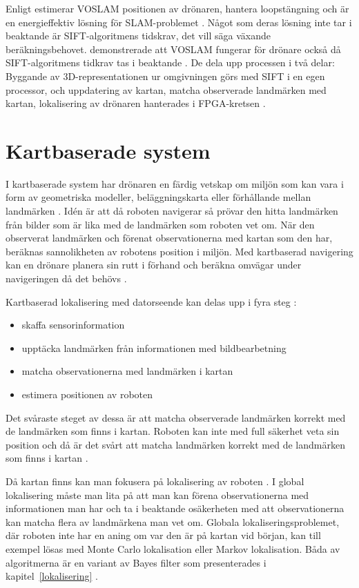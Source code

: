Enligt \cite{voslam} estimerar VOSLAM positionen av drönaren, hantera loopstängning och är en energieffektiv lösning för SLAM-problemet \citep{voslam}. Något som deras lösning inte tar i beaktande är SIFT-algoritmens tidskrav, det vill säga växande beräkningsbehovet. \cite{voslamlatif} demonstrerade att VOSLAM fungerar för drönare också då SIFT-algoritmens tidkrav tas i beaktande \citep{voslamlatif}. De dela upp processen i två delar: Byggande av 3D-representationen ur omgivningen görs med SIFT i en egen processor, och uppdatering av kartan, matcha observerade landmärken med kartan, lokalisering av drönaren hanterades i FPGA-kretsen \citep{voslamlatif}.

\section{Kartbaserade system}

I kartbaserade system har drönaren en färdig vetskap om miljön som kan vara i form av geometriska modeller, beläggningskarta eller förhållande mellan landmärken \citep{982903}. Idén är att då roboten navigerar så prövar den hitta landmärken från bilder som är lika med de landmärken som roboten vet om. När den observerat landmärken och förenat observationerna med kartan som den har, beräknas sannolikheten av robotens position i miljön. Med kartbaserad navigering kan en drönare planera sin rutt i förhand och beräkna omvägar under navigeringen då det behövs \citep{geospatial}. 

Kartbaserad lokalisering med datorseende kan delas upp i fyra steg \citep{982903}:

\begin{itemize}
    \item skaffa sensorinformation
    \item upptäcka landmärken från informationen med bildbearbetning
    \item matcha observationerna med landmärken i kartan
    \item estimera positionen av roboten
\end{itemize}

Det svåraste steget av dessa är att matcha observerade landmärken korrekt med de landmärken som finns i kartan. Roboten kan inte med full säkerhet veta sin position och då är det svårt att matcha landmärken korrekt med de landmärken som finns i kartan \citep{982903}.

Då kartan finns kan man fokusera på lokalisering av roboten \citep{982903}. I global lokalisering måste man lita på att man kan förena observationerna med informationen man har och ta i beaktande osäkerheten med att observationerna kan matcha flera av landmärkena man vet om. Globala lokaliseringsproblemet, där roboten inte har en aning om var den är på kartan vid början, kan till exempel lösas med Monte Carlo lokalisation eller Markov lokalisation. Båda av algoritmerna är en variant av Bayes filter som presenterades i kapitel~\ref{lokalisering} \citep{ProbabilisticRobotics}. 

